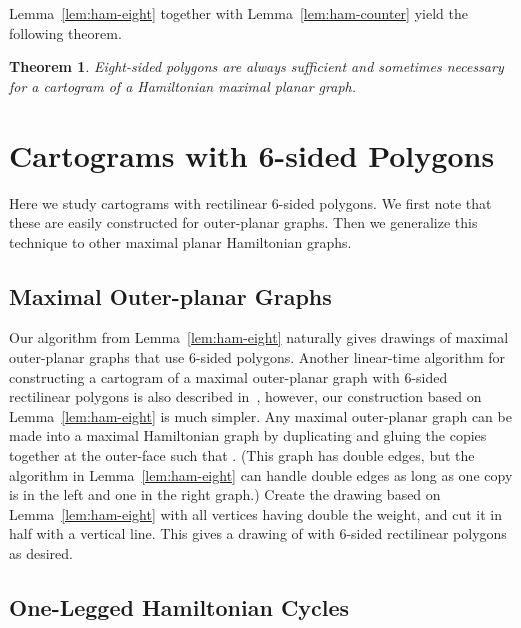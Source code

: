 \documentclass[11pt]{article}
\newtheorem{theorem}{Theorem}[section]
\begin{document}
Lemma~\ref{lem:ham-eight} together with Lemma~\ref{lem:ham-counter} yield the
following theorem.

\begin{theorem}
 Eight-sided polygons are always sufficient and sometimes necessary for a cartogram of a Hamiltonian maximal planar graph.
\end{theorem}















\section{Cartograms with 6-sided Polygons}
\label{sec:six-side}


Here we study cartograms with
rectilinear 6-sided polygons. We first note that these are
easily constructed for outer-planar graphs.  Then we generalize this
technique to other maximal planar Hamiltonian graphs.

\subsection{Maximal Outer-planar Graphs}

Our algorithm from Lemma~\ref{lem:ham-eight} naturally gives drawings
of maximal outer-planar graphs that use 6-sided polygons.
Another linear-time algorithm for constructing a cartogram of a maximal
outer-planar graph with 6-sided rectilinear polygons is also described
in~\cite{ABFGKK11}, however, our construction
based on Lemma~\ref{lem:ham-eight} is much simpler.
Any
maximal outer-planar graph  can be made into a maximal Hamiltonian
graph by duplicating  and gluing the copies together at the outer-face
such that .  (This graph has double edges, but the algorithm
in Lemma~\ref{lem:ham-eight} can handle double edges as long as one
copy is in the left and one in the right graph.)  Create the drawing
based on Lemma~\ref{lem:ham-eight} with all vertices having double the weight,
and cut it in half with a vertical line.  This gives a drawing of 
with 6-sided rectilinear polygons as desired.

\subsection{One-Legged Hamiltonian Cycles}
\end{document}
